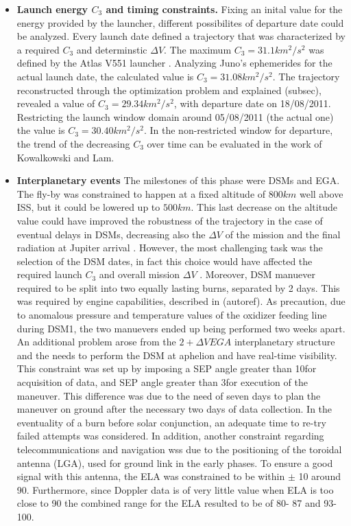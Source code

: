 \begin{itemize} 
    \item \textbf{Launch energy $C_3$ and timing constraints.} Fixing an inital value for the energy provided by the launcher, different possibilites of departure date could be analyzed. Every launch date defined a trajectory that was characterized by a required $C_3$ and determinstic $\Delta V$. The maximum $C_3 = 31.1 km^2 / s^2$ was defined by the Atlas V551 launcher \cite{atlasV_juno}. Analyzing Juno's ephemerides for the actual launch date, the calculated value is $C_3 = 31.08 km^2 / s^2$. The trajectory reconstructed through the optimization problem and explained (subsec), revealed a value of $C_3 =  29.34 km^2 / s^2$, with departure date on 18/08/2011. Restricting the launch window domain around 05/08/2011 (the actual one) the value is $C_3 = 30.40 km^2 / s^2$. In the non-restricted window for departure, the trend of the decreasing $C_3$ over time can be evaluated in the work of Kowalkowski and Lam\cite{launch_period}.
    \item \textbf{Interplanetary events} The milestones of this phase were DSMs and EGA. The fly-by was constrained to happen at a fixed altitude of $800 km$ well above ISS, but it could be lowered up to $500km$. This last decrease on the altitude value could have improved the robustness of the trajectory in the case of eventual delays in DSMs, decreasing also the $\Delta V$ of the mission and the final radiation at Jupiter arrival \cite{pre_launch_update}. However, the most challenging task was the selection of the DSM dates, in fact this choice would have affected the required launch $C_3$ and overall mission $\Delta V$ \cite{launch_period}. Moreover, DSM manuever required to be split into two equally lasting burns, separated by 2 days. This was required by engine capabilities, described in (autoref). As precaution, due to anomalous pressure and temperature values of the oxidizer feeding line during DSM1, the two manuevers ended up being performed two weeks apart. An additional problem arose from the $2+\Delta V EGA$ interplanetary structure and the needs to perform the DSM at aphelion and have real-time visibility. This constraint was set up by imposing a SEP angle greater than 10\textdegree \;for acquisition of data, and SEP angle greater than 3\textdegree \;for execution of the maneuver. This difference was due to the need of seven days to plan the maneuver on ground after the necessary two days of data collection. In the eventuality of a burn before solar conjunction, an adequate time to re-try failed attempts was considered. In addition, another constraint regarding telecommunications and navigation wss due to the positioning of the toroidal antenna (LGA), used for ground link in the early phases. To ensure a good signal with this antenna, the ELA was constrained to be within $\pm$ 10\textdegree\; around 90\textdegree. Furthermore, since Doppler data is of very little value when ELA is too close to 90\textdegree\; the combined range for the ELA resulted to be of 80\textdegree\;- 87\textdegree\; and 93\textdegree\;- 100\textdegree\;.

\end{itemize}
